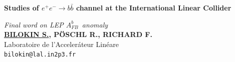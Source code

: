 \documentclass[a0,portrait]{a0poster}
\newcommand{\afb}{$A_{FB}^b$}
\begin{document}


\begin{minipage}[b]{1.\linewidth}
\veryHuge \color{NavyBlue} \textbf{Studies of $e^+e^-\to b\bar{b}$ channel at the International Linear Collider} \color{Black} %
\end{minipage}
\begin{minipage}[b]{0.5\linewidth}
\Huge\textit{Final word on LEP \afb\ anomaly}\\[1cm]
\huge \textbf{\underline{BILOKIN S.}, P\"OSCHL R., RICHARD F.}\\[0.5cm] %
\huge Laboratoire de l'Acceler\'ateur Lin\'eare\\[0.4cm] %
\Large \texttt{bilokin@lal.in2p3.fr}
\end{minipage}
\end{document}
